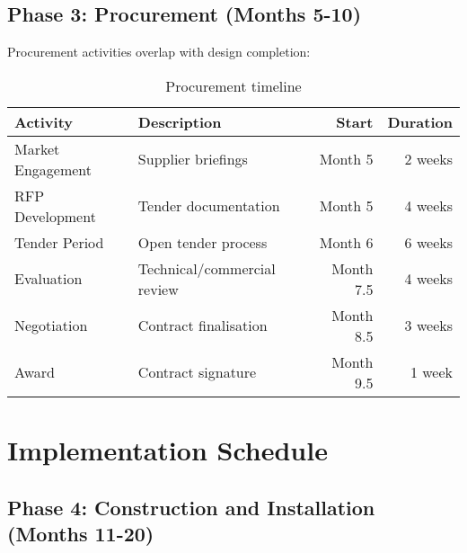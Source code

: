 \subsection{Phase 3: Procurement (Months 5-10)}

Procurement activities overlap with design completion:

\begin{table}[H]
\centering
\begin{tabularx}{\textwidth}{@{}lXrr@{}}
\toprule
\textbf{Activity} & \textbf{Description} & \textbf{Start} & \textbf{Duration} \\
\midrule
Market Engagement & Supplier briefings & Month 5 & 2 weeks \\
RFP Development & Tender documentation & Month 5 & 4 weeks \\
Tender Period & Open tender process & Month 6 & 6 weeks \\
Evaluation & Technical/commercial review & Month 7.5 & 4 weeks \\
Negotiation & Contract finalisation & Month 8.5 & 3 weeks \\
Award & Contract signature & Month 9.5 & 1 week \\
\bottomrule
\end{tabularx}
\caption{Procurement timeline}
\end{table}

\section{Implementation Schedule}

\subsection{Phase 4: Construction and Installation (Months 11-20)}


